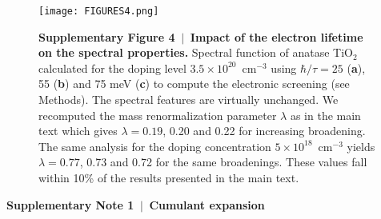 \documentclass[12pt]{nature-mod}
\begin{document}
\clearpage

 \begin{figure}
 \begin{center}
 \hspace*{-8pt} \texttt{[image: FIGURES4.png]}
 \end{center}
 \textbf{Supplementary Figure 4 $\,\bm|\,$ Impact of the electron lifetime on the spectral properties.}
 Spectral function of anatase TiO$_2$ calculated for the doping level $3.5\times10^{20}$~cm$^{-3}$ 
 using $\hbar/\tau=25$ ({\bf a}), 55 ({\bf b}) and 75 meV ({\bf c}) to compute the electronic screening 
 (see Methods). The spectral features are virtually unchanged. We recomputed the mass renormalization 
 parameter $\lambda$ as in the main text which gives $\lambda=0.19$, 0.20 and 0.22 for increasing 
 broadening. The same analysis for the doping concentration $5\times10^{18}$~cm$^{-3}$ yields 
 $\lambda=0.77$, 0.73 and 0.72 for the same broadenings. These values fall within 10\% of 
 the results presented in the main text. 
 \end{figure}

\clearpage

\textbf{Supplementary Note 1 $\,\bm|\,$ Cumulant expansion}
\end{document}
